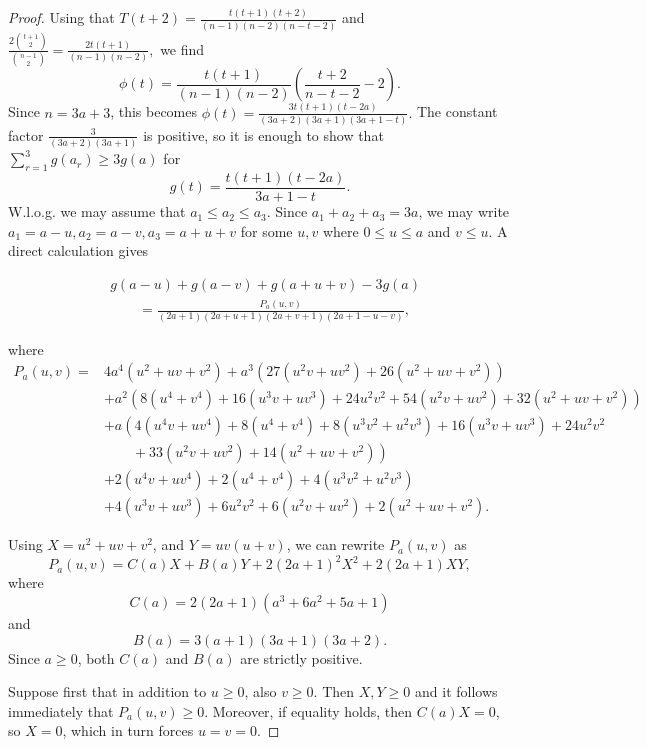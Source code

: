 \documentclass{article}
\begin{document}
\begin{proof}

Using that $T(t+2)=\frac{t(t+1)(t+2)}{(n-1)(n-2)(n-t-2)}$ and $\frac{2\binom{t+1}{2}}{\binom{n-1}{2}}
= \frac{2t(t+1)}{(n-1)(n-2)},$
we find
\[
\phi(t)
=\frac{t(t+1)}{(n-1)(n-2)}
\left(\frac{t+2}{n-t-2}-2\right).
\]
Since $n=3a+3$, this becomes $
\phi(t)
=\frac{3t(t+1)(t-2a)}{(3a+2)(3a+1)(3a+1-t)}.$
The constant factor $
\frac{3}{(3a+2)(3a+1)}$
is positive, so it is enough to show that
$
\sum_{r=1}^3 g(a_r)\ge 3g(a)$ for 
\[
g(t)=\frac{t(t+1)(t-2a)}{3a+1-t}.
\]
W.l.o.g. we may assume that
$a_1\le a_2\le a_3.
$ Since $a_1+a_2+a_3=3a$, we may write
$
a_1=a-u, a_2=a-v, a_3=a+u+v
$
for some $u,v$ where $0\leq u\leq a$ and $v\leq u$. A direct calculation gives

\begin{align}
&g(a-u)+g(a-v)+g(a+u+v)-3g(a)\nonumber \\
&\qquad =
\frac{P_a(u,v)}
{(2a+1)(2a+u+1)(2a+v+1)(2a+1-u-v)}, \label{app}
\end{align}

where
\[
\begin{aligned}
P_a(u,v)={}&4a^4(u^2+uv+v^2) +a^3\left(27(u^2v+uv^2)+26(u^2+uv+v^2)\right)\\
&+a^2\left(8(u^4+v^4)+16(u^3v+uv^3)+24u^2v^2+54(u^2v+uv^2)+32(u^2+uv+v^2)\right)\\
&+a\left(4(u^4v+uv^4)+8(u^4+v^4)+8(u^3v^2+u^2v^3) +16(u^3v+uv^3)+24u^2v^2\right.\\
&\left.\qquad +33(u^2v+uv^2)+14(u^2+uv+v^2)\right)\\
&+2(u^4v+uv^4)+2(u^4+v^4)+4(u^3v^2+u^2v^3)\\
& +4(u^3v+uv^3)+6u^2v^2+6(u^2v+uv^2)+2(u^2+uv+v^2).
\end{aligned}
\]

Using $X=u^2+uv+v^2$, and $Y=uv(u+v)$, we can rewrite $P_a(u,v)$ as
\[
P_a(u,v)=C(a)X+B(a)Y+2(2a+1)^2X^2+2(2a+1)XY,
\]
where
\[
C(a)=2(2a+1)(a^3+6a^2+5a+1)
\]
and
\[
B(a)=3(a+1)(3a+1)(3a+2).
\]
Since $a\geq0$, both $C(a)$ and $B(a)$ are strictly positive.

Suppose first that in addition to $u\geq 0$, also $v\geq0$. Then $X,Y\geq 0$ and it follows immediately that $P_a(u,v)\geq 0$. Moreover, if equality holds, then $C(a)X=0$, so $X=0$, which in turn forces $u=v=0.$


\end{proof}
\end{document}
